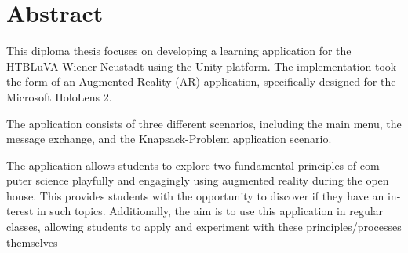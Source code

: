 \chapter{Abstract}

\begin{english} %
This diploma thesis focuses on developing a learning application for the HTBLuVA Wiener Neustadt using the Unity platform.
The implementation took the form of an Augmented Reality (AR) application, specifically designed for the Microsoft HoloLens 2.

The application consists of three different scenarios, including the main menu, the message exchange, and the
Knapsack-Problem application scenario.

The application allows students to explore two fundamental principles of computer science playfully and engagingly
using augmented reality during the open house. This provides students with the opportunity to discover if they have
an interest in such topics. Additionally, the aim is to use this application in regular classes, allowing students
to apply and experiment with these principles/processes themselves
\end{english}


